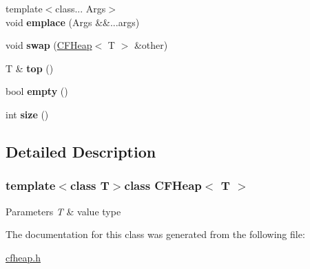 \begin{DoxyCompactItemize}
\item 
\hypertarget{classCFHeap_af1de752ac911f8a375b3cc950d18fa08}{}{\footnotesize template$<$class... Args$>$ }\\void {\bfseries emplace} (Args \&\&...args)\label{classCFHeap_af1de752ac911f8a375b3cc950d18fa08}

\item 
\hypertarget{classCFHeap_a28b68f0ca4a44eff416b3ca7e1621ff9}{}void {\bfseries swap} (\hyperlink{classCFHeap}{C\+F\+Heap}$<$ T $>$ \&other)\label{classCFHeap_a28b68f0ca4a44eff416b3ca7e1621ff9}

\item 
\hypertarget{classCFHeap_af0a6830eb86fcb3bcc1485538c959814}{}T \& {\bfseries top} ()\label{classCFHeap_af0a6830eb86fcb3bcc1485538c959814}

\item 
\hypertarget{classCFHeap_ad597329cc623f458028fa709ed42c350}{}bool {\bfseries empty} ()\label{classCFHeap_ad597329cc623f458028fa709ed42c350}

\item 
\hypertarget{classCFHeap_ad1da44c44160703f0a9e57d6675a1f73}{}int {\bfseries size} ()\label{classCFHeap_ad1da44c44160703f0a9e57d6675a1f73}

\end{DoxyCompactItemize}


\subsection{Detailed Description}
\subsubsection*{template$<$class T$>$class C\+F\+Heap$<$ T $>$}


\begin{DoxyParams}{Parameters}
{\em T} & value type \\
\hline
\end{DoxyParams}


The documentation for this class was generated from the following file\+:\begin{DoxyCompactItemize}
\item 
\hyperlink{cfheap_8h}{cfheap.\+h}\end{DoxyCompactItemize}
